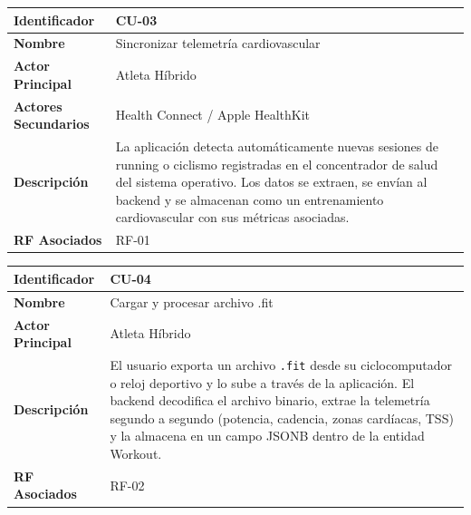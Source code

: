 \documentclass[12pt]{article}
\begin{document}
\begin{table}[h!]
    \centering
    \renewcommand{\arraystretch}{1.3}
    \begin{tabular}{|p{3.5cm}|p{11.5cm}|}
        \hline
        \rowcolor[HTML]{EFEFEF}
        \textbf{Identificador} & \textbf{CU-03} \\ \hline
        \textbf{Nombre} & Sincronizar telemetría cardiovascular \\ \hline
        \textbf{Actor Principal} & Atleta Híbrido \\ \hline
        \textbf{Actores Secundarios} & Health Connect / Apple HealthKit \\ \hline
        \textbf{Descripción} & La aplicación detecta automáticamente nuevas sesiones de running o ciclismo registradas en el concentrador de salud del sistema operativo. Los datos se extraen, se envían al backend y se almacenan como un entrenamiento cardiovascular con sus métricas asociadas. \\ \hline
        \textbf{RF Asociados} & RF-01 \\ \hline
    \end{tabular}
\end{table}
\newpage
\begin{table}[h!]
    \centering
    \renewcommand{\arraystretch}{1.3}
    \begin{tabular}{|p{3.5cm}|p{11.5cm}|}
        \hline
        \rowcolor[HTML]{EFEFEF}
        \textbf{Identificador} & \textbf{CU-04} \\ \hline
        \textbf{Nombre} & Cargar y procesar archivo .fit \\ \hline
        \textbf{Actor Principal} & Atleta Híbrido \\ \hline
        \textbf{Descripción} & El usuario exporta un archivo \texttt{.fit} desde su ciclocomputador o reloj deportivo y lo sube a través de la aplicación. El backend decodifica el archivo binario, extrae la telemetría segundo a segundo (potencia, cadencia, zonas cardíacas, TSS) y la almacena en un campo JSONB dentro de la entidad Workout. \\ \hline
        \textbf{RF Asociados} & RF-02 \\ \hline
    \end{tabular}
\end{table}
\end{document}
